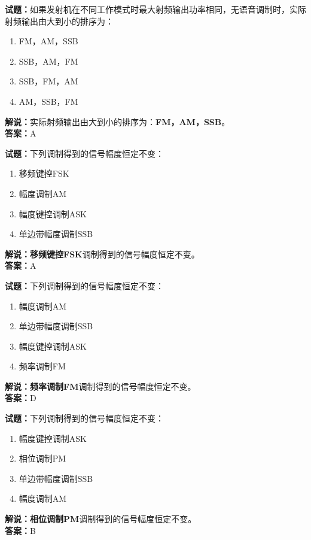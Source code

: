 \documentclass{ctexbook}
\begin{document}
\vspace{1em}

\textbf{试题：}如果发射机在不同工作模式时最大射频输出功率相同，无语音调制时，实际射频输出由大到小的排序为：
\begin{enumerate}[leftmargin=3em]
  \item FM，AM，SSB
  \item SSB，AM，FM
  \item SSB，FM，AM
  \item AM，SSB，FM
\end{enumerate}
\noindent\textbf{解说：}实际射频输出由大到小的排序为：\textbf{FM，AM，SSB}。\\\noindent\textbf{答案：}A

\vspace{1em}

\textbf{试题：}下列调制得到的信号幅度恒定不变：
\begin{enumerate}[leftmargin=3em]
  \item 移频键控FSK
  \item 幅度调制AM
  \item 幅度键控调制ASK
  \item 单边带幅度调制SSB
\end{enumerate}
\noindent\textbf{解说：}\textbf{移频键控FSK}调制得到的信号幅度恒定不变。\\\noindent\textbf{答案：}A

\vspace{1em}

\textbf{试题：}下列调制得到的信号幅度恒定不变：
\begin{enumerate}[leftmargin=3em]
  \item 幅度调制AM
  \item 单边带幅度调制SSB
  \item 幅度键控调制ASK
  \item 频率调制FM
\end{enumerate}
\noindent\textbf{解说：}\textbf{频率调制FM}调制得到的信号幅度恒定不变。\\\noindent\textbf{答案：}D

\vspace{1em}

\textbf{试题：}下列调制得到的信号幅度恒定不变：
\begin{enumerate}[leftmargin=3em]
  \item 幅度键控调制ASK
  \item 相位调制PM
  \item 单边带幅度调制SSB
  \item 幅度调制AM
\end{enumerate}
\noindent\textbf{解说：}\textbf{相位调制PM}调制得到的信号幅度恒定不变。\\\noindent\textbf{答案：}B
\end{document}
